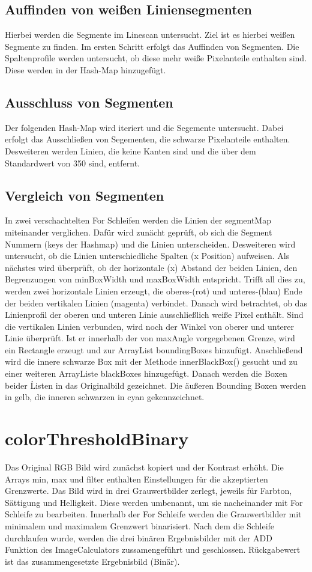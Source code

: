 \documentclass[a4paper,11pt,parskip]{article}
\begin{document}
\subsection{Auffinden von weißen Liniensegmenten}
Hierbei werden die Segmente im Linescan untersucht. Ziel ist es hierbei weißen Segmente zu finden. Im ersten Schritt erfolgt das Auffinden von Segmenten. Die Spaltenprofile werden untersucht, ob diese mehr weiße Pixelanteile enthalten sind. Diese werden in der Hash-Map hinzugefügt.

\subsection{Ausschluss von Segmenten}
Der folgenden Hash-Map wird iteriert und die Segemente untersucht. Dabei erfolgt das Ausschließen von Segementen, die schwarze Pixelanteile enthalten. Desweiteren werden Linien, die keine Kanten sind und die über dem Standardwert von 350 sind, entfernt. 

\subsection{Vergleich von Segmenten}
In zwei verschachtelten For Schleifen werden die Linien der segmentMap miteinander verglichen. 
Dafür wird zunächt geprüft, ob sich die Segment Nummern (keys der Hashmap) und die Linien unterscheiden. Desweiteren wird untersucht, ob die Linien unterschiedliche Spalten (x Position) aufweisen. 
Als nächstes wird überprüft, ob der horizontale (x) Abstand der beiden Linien, den Begrenzungen von minBoxWidth und maxBoxWidth entspricht.
Trifft all dies zu, werden zwei horizontale Linien erzeugt, die oberes-(rot) und unteres-(blau) Ende der beiden vertikalen Linien (magenta) verbindet. 
Danach wird betrachtet, ob das Linienprofil der oberen und unteren Linie ausschließlich weiße Pixel enthält.
Sind die vertikalen Linien verbunden, wird noch der Winkel von oberer und unterer Linie überprüft. Ist er innerhalb der von maxAngle vorgegebenen Grenze, wird ein Rectangle erzeugt und zur ArrayList boundingBoxes hinzufügt.
Anschließend wird die innere schwarze Box mit der Methode innerBlackBox() gesucht und zu einer weiteren ArrayListe blackBoxes hinzugefügt. Danach werden die Boxen beider Ĺisten in das Originalbild gezeichnet. Die äußeren Bounding Boxen werden in gelb, die inneren schwarzen in cyan gekennzeichnet.

\section{colorThresholdBinary}
Das Original RGB Bild wird zunächst kopiert und der Kontrast erhöht. Die Arrays min, max und filter enthalten Einstellungen für die akzeptierten Grenzwerte. Das Bild wird in drei Grauwertbilder zerlegt, jeweils für Farbton, Sättigung und Helligkeit. Diese werden umbenannt, um sie nacheinander mit For Schleife zu bearbeiten. Innerhalb der For Schleife werden die Grauwertbilder mit minimalem und maximalem Grenzwert binarisiert. Nach dem die Schleife durchlaufen wurde, werden die drei binären Ergebnisbilder mit der ADD Funktion des ImageCalculators zussamengeführt und geschlossen. Rückgabewert ist das zusammengesetzte Ergebnisbild (Binär).
\end{document}
